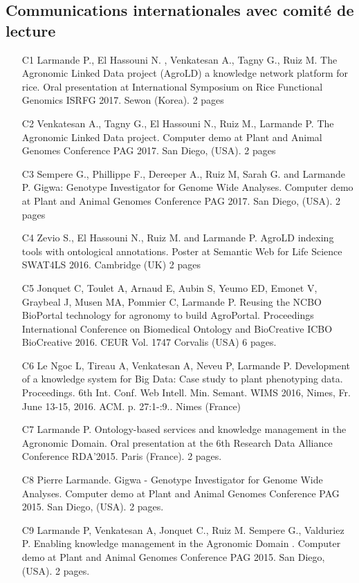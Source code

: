 \subsection*{Communications internationales avec comité de lecture}
\begin{itemize} 
\item [C1]	Larmande P., El Hassouni N. , Venkatesan A., Tagny G., Ruiz M. The Agronomic Linked Data project (AgroLD) a knowledge network platform for rice. Oral presentation at International Symposium on Rice Functional Genomics ISRFG 2017. Sewon (Korea). 2 pages
\item [C2]	Venkatesan A., Tagny G., El Hassouni N., Ruiz M., Larmande P. The Agronomic Linked Data project. Computer demo at Plant and Animal Genomes Conference PAG 2017. San Diego, (USA). 2 pages
\item [C3]	 Sempere G., Phillippe  F., Dereeper A., Ruiz M, Sarah G. and Larmande P. Gigwa: Genotype Investigator for Genome Wide Analyses. Computer demo at Plant and Animal Genomes Conference PAG 2017. San Diego, (USA). 2 pages
\item [C4]	Zevio S., El Hassouni N., Ruiz M. and Larmande P. AgroLD indexing tools with ontological annotations. Poster at Semantic Web for Life Science SWAT4LS 2016. Cambridge (UK) 2 pages
\item [C5]	Jonquet C, Toulet A, Arnaud E, Aubin S, Yeumo ED, Emonet V, Graybeal J, Musen MA, Pommier C, Larmande P.   Reusing the NCBO BioPortal technology for agronomy to build AgroPortal. Proceedings International Conference on Biomedical Ontology and BioCreative ICBO BioCreative 2016. CEUR Vol. 1747 Corvalis (USA) 6 pages.
\item [C6]	Le Ngoc L, Tireau A, Venkatesan A, Neveu P, Larmande P. Development of a knowledge system for Big Data: Case study to plant phenotyping data. Proceedings. 6th Int. Conf. Web Intell. Min. Semant. WIMS 2016, Nimes, Fr. June 13-15, 2016. ACM. p. 27:1-:9.. Nimes (France) 
\item [C7]	Larmande P. Ontology-based services and knowledge management in the Agronomic Domain. Oral presentation at the 6th Research Data Alliance Conference RDA’2015. Paris (France). 2 pages.
\item [C8]	Pierre Larmande. Gigwa - Genotype Investigator for Genome Wide Analyses. Computer demo at Plant and Animal Genomes Conference PAG 2015. San Diego, (USA). 2 pages.
\item [C9]	Larmande P, Venkatesan A, Jonquet C., Ruiz M. Sempere G., Valduriez P. Enabling knowledge management in the Agronomic Domain . Computer demo at Plant and Animal Genomes Conference PAG 2015. San Diego, (USA). 2 pages.

\end{itemize}
